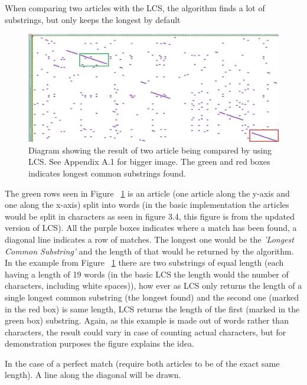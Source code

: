 When comparing two articles with the LCS, the algorithm finds a lot of substrings, but only keeps the longest by default
\begin{figure}
	\centering
	\includegraphics[scale=0.4]{figures/LcsExample}
	\caption{Diagram showing the result of two article being compared by using LCS. See Appendix A.1 for bigger image. The green and red boxes indicates longest common substrings found.}
	\label{LcsEx}
\end{figure}

The green rows seen in Figure ~\ref{LcsEx} is an article (one article along the y-axis and one along the x-axis) split into words (in the basic implementation the articles would be split in characters as seen in figure 3.4, this figure is from the updated version of LCS). All the purple boxes indicates where a match has been found, a diagonal line indicates a row of matches. The longest one would be the \textit{'Longest Common Substring'} and the length of that would be returned by the algorithm. In the example from Figure ~\ref{LcsEx} there are two substrings of equal length (each having a length of 19 words (in the basic LCS the length would the number of characters, including white spaces)), how ever as LCS only returns the length of a single longest common substring (the longest found) and the second one (marked in the red box) is same length, LCS returns the length of the first (marked in the green box) substring. Again, as this example is made out of words rather than characters, the result could vary in case of counting actual characters, but for demonstration purposes the figure explains the idea.

In the case of a perfect match (require both articles to be of the exact same length). A line along the diagonal will be drawn.

